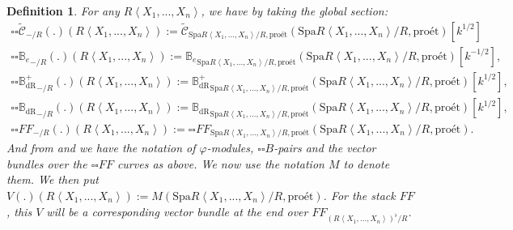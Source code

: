 \documentclass[12pt]{book}
\newtheorem{definition}{Definition}
\begin{document}
\begin{definition}
For any $R\left<X_1,...,X_n\right>$, we have by taking the global section:
\begin{align}
{\square\square}\widetilde{\mathcal{C}}_{-/R}(.)(R\left<X_1,...,X_n\right>):=\widetilde{\mathcal{C}}_{\mathrm{Spa}R\left<X_1,...,X_n\right>/R,\text{pro\'et}}(\mathrm{Spa}R\left<X_1,...,X_n\right>/R,\text{pro\'et})[k^{1/2}]\\
{\square\square}{\mathbb{B}_e}_{-/R}(.)(R\left<X_1,...,X_n\right>):={\mathbb{B}_e}_{\mathrm{Spa}R\left<X_1,...,X_n\right>/R,\text{pro\'et}}(\mathrm{Spa}R\left<X_1,...,X_n\right>/R,\text{pro\'et})[k^{-1/2}],\\
{\square\square}{\mathbb{B}_\mathrm{dR}^+}_{-/R}(.)(R\left<X_1,...,X_n\right>):={\mathbb{B}_\mathrm{dR}^+}_{\mathrm{Spa}R\left<X_1,...,X_n\right>/R,\text{pro\'et}}(\mathrm{Spa}R\left<X_1,...,X_n\right>/R,\text{pro\'et})[k^{1/2}],\\
{\square\square}{\mathbb{B}_\mathrm{dR}}_{-/R}(.)(R\left<X_1,...,X_n\right>):={\mathbb{B}_\mathrm{dR}}_{\mathrm{Spa}R\left<X_1,...,X_n\right>/R,\text{pro\'et}}(\mathrm{Spa}R\left<X_1,...,X_n\right>/R,\text{pro\'et})[k^{1/2}],\\
{\square\square}{{FF}}_{-/R}(.)(R\left<X_1,...,X_n\right>):={\square\square}{FF}_{\mathrm{Spa}R\left<X_1,...,X_n\right>/R,\text{pro\'et}}(\mathrm{Spa}R\left<X_1,...,X_n\right>/R,\text{pro\'et}).
\end{align}
And from \cite[Definition 9.3.3, Definition 9.3.5, Definition 9.3.11, Definition 9.3.9]{KL1} and \cite{KL2} we have the notation of $\varphi$-modules, ${\square\square}B$-pairs and the vector bundles over the ${\square\square}FF$ curves as above. We now use the notation $M$ to denote them. We then put $V(.)(R\left<X_1,...,X_n\right>):=M(\mathrm{Spa}R\left<X_1,...,X_n\right>/R,\text{pro\'et})$. For the stack $FF$, this $V$ will be a corresponding vector bundle at the end over $FF_{(R\left<X_1,...,X_n\right>)^\flat/R}$. 	
\end{definition}
  
\end{document}
